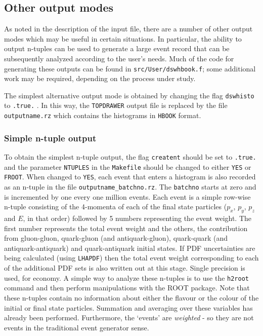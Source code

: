 \documentclass[12pt]{article}
\begin{document}
\subsection{Other output modes}
\label{subsec:otheroutput}
As noted in the description of the input file, there are a number of other
output modes which may be useful in certain situations. In particular, the
ability to output n-tuples can be used to generate a large event record that 
can be subsequently analyzed according to the user's needs. Much of the code
for generating these outputs can be found in {\tt src/User/dswhbook.f}; some
additional work may be required, depending on the process under study.

The simplest alternative output mode is obtained by changing the flag
{\tt dswhisto} to {\tt .true.} . In this way, the {\tt TOPDRAWER} output file is
replaced by the file {\tt outputname.rz} which contains the histograms in {\tt HBOOK}
format.

\subsubsection{Simple n-tuple output}
To obtain the simplest n-tuple output, the flag {\tt creatent} should be set
to {\tt .true.} and the parameter {\tt NTUPLES} in the {\tt Makefile} should be changed
to either {\tt YES} or {\tt FROOT}. When changed to {\tt YES}, each event that enters a histogram
is also recorded as an n-tuple in the file {\tt outputname\_batchno.rz}. The {\tt batchno}
starts at zero and is incremented by one every one million events. Each event
is a simple row-wise n-tuple consisting of the 4-momenta of each of the final
state particles ($p_x$, $p_y$, $p_z$ and $E$, in that order) followed by 5 numbers
representing the event weight. The first number represents the total event weight
and the others, the contribution from gluon-gluon, quark-gluon (and antiquark-gluon),
quark-quark (and antiquark-antiquark) and quark-antiquark initial states. If
PDF uncertainties are being calculated (using {\tt LHAPDF}) then the total event weight
corresponding to each of the additional PDF sets is also written out at this stage.
Single precision is used, for economy. A simple way to analyze 
these n-tuples is to use the {\tt h2root} command and then perform
manipulations with the ROOT package. Note that these n-tuples contain
no information about either the flavour or the colour of the initial or final
state particles. Summation and averaging over these variables has already been
performed. Furthermore, the `events' are {\it weighted} - so they are not events
in the traditional event generator sense.
\end{document}
